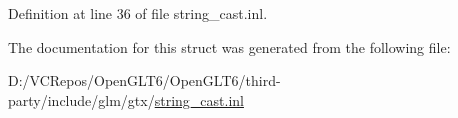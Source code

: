 Definition at line 36 of file string\+\_\+cast.\+inl.



The documentation for this struct was generated from the following file\+:\begin{DoxyCompactItemize}
\item 
D\+:/\+V\+C\+Repos/\+Open\+G\+L\+T6/\+Open\+G\+L\+T6/third-\/party/include/glm/gtx/\mbox{\hyperlink{string__cast_8inl}{string\+\_\+cast.\+inl}}\end{DoxyCompactItemize}
